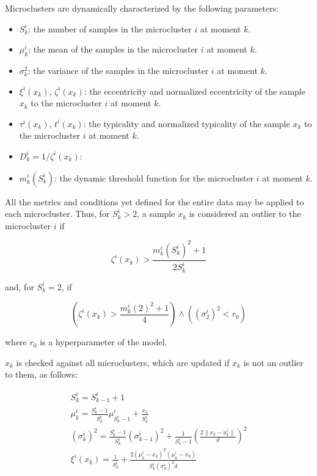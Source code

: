 \documentclass[a4paper]{article}
\begin{document}
Microclusters are dynamically characterized by the following parameters:

\begin{itemize}
    \item $S^i_k$: the number of samples in the microcluster $i$ at moment $k$.
    \item $\mu^i_k$: the mean of the samples in the microcluster $i$ at moment $k$.
    \item $\sigma^2_k$: the variance of the samples in the microcluster $i$ at moment $k$.
    \item $\xi^i(x_k)$, $\zeta^i(x_k)$: the eccentricity and normalized eccentricity of the sample $x_k$ to the microcluster $i$ at moment $k$.
    \item $\tau^i(x_k)$, $t^i(x_k)$: the typicality and normalized typicality of the sample $x_k$ to the microcluster $i$ at moment $k$.
    \item $D^i_k = 1 / \zeta^i(x_k)$: 
    \item $m^i_k(S^i_k)$: the dynamic threshold function for the microcluster $i$ at moment $k$.
\end{itemize}

All the metrics and conditions yet defined for the entire data may be applied to each microcluster. Thus, for $S^i_k > 2$, a sample $x_k$ is considered an outlier to the microcluster $i$ if

\begin{equation}
    \zeta^i(x_k) > \frac{m^i_k(S^i_k)^2 + 1}{2S^i_k}
\end{equation}

and, for $S^i_k = 2$, if

\begin{equation}
    \left( \zeta^i(x_k) > \frac{m^i_k(2)^2 + 1}{4} \right) \land \left( \left( \sigma^i_2 \right)^2 < r_0 \right) \label{critique:incorrect_condition_logic}
\end{equation}

where $r_0$ is a hyperparameter of the model.

$x_k$ is checked against all microclusters, which are updated if $x_k$ is not an outlier to them, as follows:

\begin{equation}
\begin{gathered}
    S^i_k = S^i_{k-1} + 1 \\
    \mu^i_k = \frac{S^i_k - 1}{S^i_k} \mu^i_{S^i_{k}-1} + \frac{x_k}{S^i_k} \\
    \left(\sigma^i_k\right)^2 = \frac{S^i_k - 1}{S^i_k} \left(\sigma^i_{k-1}\right)^2 + \frac{1}{S^i_k - 1} \left( \frac{2\lVert x_k - u^i_k \rVert }{d} \right)^2 \\
    \xi^i(x_k) = \frac{1}{S^i_k} + \frac{2\left( \mu^i_k - x_k \right)^T \left( \mu^i_k - x_k \right)}{S^i_k \left( \sigma^i_k \right)^2d}
\end{gathered} \label{critique:dimensionality_penalty}
\end{equation}
\end{document}
